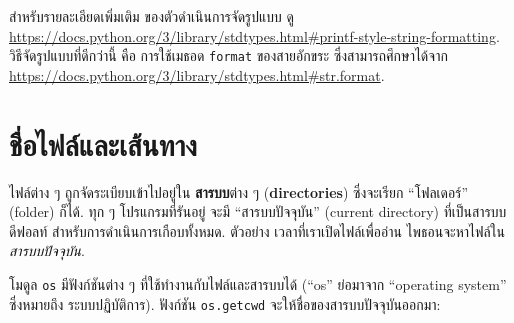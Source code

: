 สำหรับรายละเอียดเพิ่มเติม ของตัวดำเนินการจัดรูปแบบ ดู \\
%
\url{https://docs.python.org/3/library/stdtypes.html#printf-style-string-formatting}.
%
วิธีจัดรูปแบบที่ดีกว่านี้%
คือ การใช้เมธอด \texttt{format} ของสายอักขระ
ซึ่งสามารถศึกษาได้จาก
\url{https://docs.python.org/3/library/stdtypes.html#str.format}.





\section{ชื่อไฟล์และเส้นทาง}
\label{paths}


ไฟล์ต่าง ๆ ถูกจัดระเบียบเข้าไปอยู่ใน \textbf{สารบบ}ต่าง ๆ (\textbf{directories}) ซึ่งจะเรียก ``โฟลเดอร์'' (folder) ก็ได้.
ทุก ๆ โปรแกรมที่รันอยู่ จะมี ``สารบบปัจจุบัน'' (current directory) 
ที่เป็นสารบบดีฟอลท์ สำหรับการดำเนินการเกือบทั้งหมด.
ตัวอย่าง เวลาที่เราเปิดไฟล์เพื่ออ่าน ไพธอนจะหาไฟล์ใน\textit{สารบบปัจจุบัน}.


โมดูล \texttt{os} มีฟังก์ชันต่าง ๆ ที่ใช้ทำงานกับไฟล์และสารบบได้ 
(``os'' ย่อมาจาก ``operating system'' ซึ่งหมายถึง ระบบปฏิบัติการ).
ฟังก์ชัน \texttt{os.getcwd} จะให้ชื่อของสารบบปัจจุบันออกมา:

